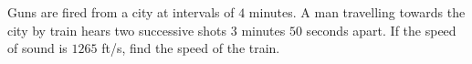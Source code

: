Guns are fired from a city at intervals of $4$ minutes. A man travelling towards the city by train hears two successive shots $3$ minutes $50$ seconds apart. If the speed of sound is $1265$ ft/s, find the speed of the train.

